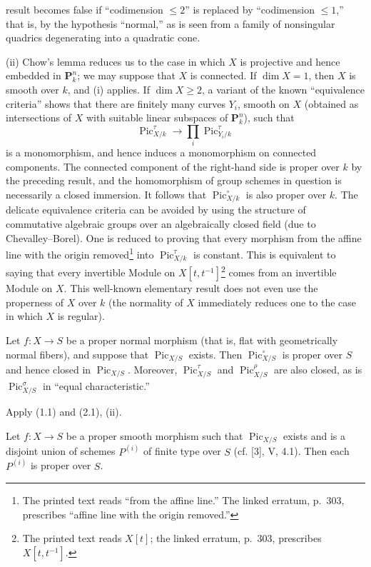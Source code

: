result becomes false if “codimension $\leq2$” is replaced by “codimension
$\leq1$,” that is, by the hypothesis “normal,” as is seen from a family of
nonsingular quadrics degenerating into a quadratic cone.

(ii) Chow's lemma reduces us to the case in which $X$ is projective and hence
embedded in $\mathbf P_k^n$; we may suppose that $X$ is connected. If
$\dim X=1$, then $X$ is smooth over $k$, and (i) applies. If $\dim X\geq2$, a
variant of the known “equivalence criteria” shows that there are finitely many
curves $Y_i$, smooth on $X$ (obtained as intersections of $X$ with suitable
linear subspaces of $\mathbf P_k^n$), such that
\[
\operatorname{Pic}_{X/k}^\tau\longrightarrow
\prod_i\operatorname{Pic}_{Y_i/k}^\tau
\]
is a monomorphism, and hence induces a monomorphism on connected components.
The connected component of the right-hand side is proper over $k$ by the
preceding result, and the homomorphism of group schemes in question is
necessarily a closed immersion. It follows that
$\operatorname{Pic}_{X/k}^\circ$ is also proper over $k$. The delicate
equivalence criteria can be avoided by using the structure of commutative
algebraic groups over an algebraically closed field (due to Chevalley--Borel).
One is reduced to proving that every morphism from the affine line with the
origin removed\footnote{The printed text reads “from the affine line.” The
linked erratum, p.~303, prescribes “affine line with the origin removed.”} into
$\operatorname{Pic}_{X/k}^\tau$ is constant. This is equivalent to saying that
every invertible Module on $X[t,t^{-1}]$\footnote{The printed text reads
$X[t]$; the linked erratum, p.~303, prescribes $X[t,t^{-1}]$.} comes from an
invertible Module on $X$. This well-known elementary result does not even use
the properness of $X$ over $k$ (the normality of $X$ immediately reduces one
to the case in which $X$ is regular).

 Let $f:X\longrightarrow S$ be a proper normal morphism
(that is, flat with geometrically normal fibers), and suppose that
$\operatorname{Pic}_{X/S}$ exists. Then $\operatorname{Pic}_{X/S}^\circ$ is
proper over $S$ and hence closed in $\operatorname{Pic}_{X/S}$. Moreover,
$\operatorname{Pic}_{X/S}^\tau$ and $\operatorname{Pic}_{X/S}^\rho$ are also
closed, as is $\operatorname{Pic}_{X/S}^\sigma$ in “equal characteristic.”

Apply (1.1) and (2.1), (ii).

 Let $f:X\longrightarrow S$ be a proper smooth morphism
such that $\operatorname{Pic}_{X/S}$ exists and is a disjoint union of schemes
$P^{(i)}$ of finite type over $S$ (cf. [3], V, 4.1). Then each $P^{(i)}$ is
proper over $S$.

